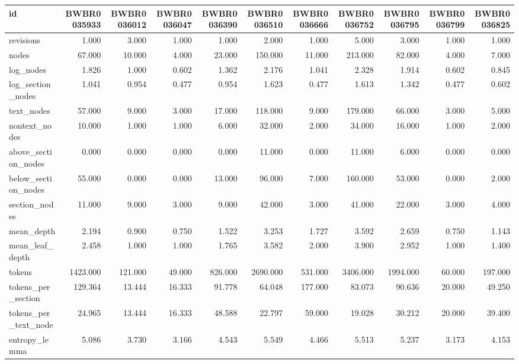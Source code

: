 \begin{tabular}{lrrrrrrrrrr}
\toprule
id & BWBR0035933 & BWBR0036012 & BWBR0036047 & BWBR0036390 & BWBR0036510 & BWBR0036666 & BWBR0036752 & BWBR0036795 & BWBR0036799 & BWBR0036825 \\
\midrule
revisions & 1.000 & 3.000 & 1.000 & 1.000 & 2.000 & 1.000 & 5.000 & 3.000 & 1.000 & 1.000 \\
\cline{1-11}
nodes & 67.000 & 10.000 & 4.000 & 23.000 & 150.000 & 11.000 & 213.000 & 82.000 & 4.000 & 7.000 \\
\cline{1-11}
log\_nodes & 1.826 & 1.000 & 0.602 & 1.362 & 2.176 & 1.041 & 2.328 & 1.914 & 0.602 & 0.845 \\
\cline{1-11}
log\_section\_nodes & 1.041 & 0.954 & 0.477 & 0.954 & 1.623 & 0.477 & 1.613 & 1.342 & 0.477 & 0.602 \\
\cline{1-11}
text\_nodes & 57.000 & 9.000 & 3.000 & 17.000 & 118.000 & 9.000 & 179.000 & 66.000 & 3.000 & 5.000 \\
\cline{1-11}
nontext\_nodes & 10.000 & 1.000 & 1.000 & 6.000 & 32.000 & 2.000 & 34.000 & 16.000 & 1.000 & 2.000 \\
\cline{1-11}
above\_section\_nodes & 0.000 & 0.000 & 0.000 & 0.000 & 11.000 & 0.000 & 11.000 & 6.000 & 0.000 & 0.000 \\
\cline{1-11}
below\_section\_nodes & 55.000 & 0.000 & 0.000 & 13.000 & 96.000 & 7.000 & 160.000 & 53.000 & 0.000 & 2.000 \\
\cline{1-11}
section\_nodes & 11.000 & 9.000 & 3.000 & 9.000 & 42.000 & 3.000 & 41.000 & 22.000 & 3.000 & 4.000 \\
\cline{1-11}
mean\_depth & 2.194 & 0.900 & 0.750 & 1.522 & 3.253 & 1.727 & 3.592 & 2.659 & 0.750 & 1.143 \\
\cline{1-11}
mean\_leaf\_depth & 2.458 & 1.000 & 1.000 & 1.765 & 3.582 & 2.000 & 3.900 & 2.952 & 1.000 & 1.400 \\
\cline{1-11}
tokens & 1423.000 & 121.000 & 49.000 & 826.000 & 2690.000 & 531.000 & 3406.000 & 1994.000 & 60.000 & 197.000 \\
\cline{1-11}
tokens\_per\_section & 129.364 & 13.444 & 16.333 & 91.778 & 64.048 & 177.000 & 83.073 & 90.636 & 20.000 & 49.250 \\
\cline{1-11}
tokens\_per\_text\_node & 24.965 & 13.444 & 16.333 & 48.588 & 22.797 & 59.000 & 19.028 & 30.212 & 20.000 & 39.400 \\
\cline{1-11}
entropy\_lemma & 5.086 & 3.730 & 3.166 & 4.543 & 5.549 & 4.466 & 5.513 & 5.237 & 3.173 & 4.153 \\

\end{tabular}
